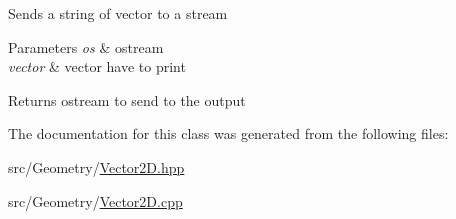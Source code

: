Sends a string of vector to a stream 
\begin{DoxyParams}{Parameters}
{\em os} & ostream \\
\hline
{\em vector} & vector have to print \\
\hline
\end{DoxyParams}
\begin{DoxyReturn}{Returns}
ostream to send to the output 
\end{DoxyReturn}


The documentation for this class was generated from the following files\+:\begin{DoxyCompactItemize}
\item 
src/\+Geometry/\hyperlink{_vector2_d_8hpp}{Vector2\+D.\+hpp}\item 
src/\+Geometry/\hyperlink{_vector2_d_8cpp}{Vector2\+D.\+cpp}\end{DoxyCompactItemize}
